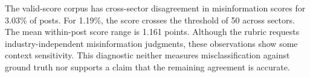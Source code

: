 The valid-score corpus has cross-sector disagreement in misinformation scores for 3.03\% of posts. For 1.19\%, the score crosses the threshold of 50 across sectors. The mean within-post score range is 1.161 points. Although the rubric requests industry-independent misinformation judgments, these observations show some context sensitivity. This diagnostic neither measures misclassification against ground truth nor supports a claim that the remaining agreement is accurate.
